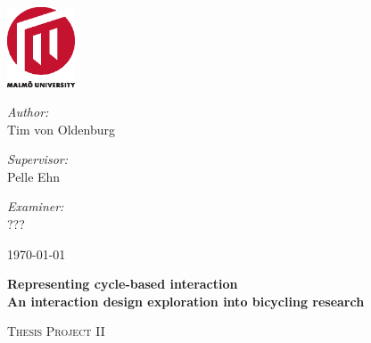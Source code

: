 \begin{titlepage}


\begin{center}

\AddToShipoutPicture*{\BackgroundPic}

\includegraphics[width=0.15\textwidth]{mah2.eps}~\\[1cm]

\vspace*{1.5cm}

\begin{minipage}{0.43\textwidth}
\begin{flushleft} \large
\emph{Author:}\\
Tim von Oldenburg
\end{flushleft}
\end{minipage}
\begin{minipage}{0.43\textwidth}
\begin{flushright} \large
\emph{Supervisor:} \\
Pelle Ehn
\end{flushright}
\end{minipage}

\vspace*{0.4cm}

\begin{minipage}{0.86\textwidth}
\begin{flushright} \large
\emph{Examiner:} \\
???
\end{flushright}
\end{minipage}

\vspace*{3.5cm}

{\large \today}

\vfill
\begin{minipage}{0.86\textwidth}
\begin{flushleft} \large

\vspace*{0.4cm}
\begin{spacing}{1.0}
{ \huge \bfseries Representing cycle-based interaction\\[0.4cm]\large{An interaction design exploration into bicycling research}}
\end{spacing}
\vspace*{1.5cm}
\textsc{\Large Thesis Project II}
\end{flushleft}
\end{minipage}




\end{center}
\end{titlepage}

